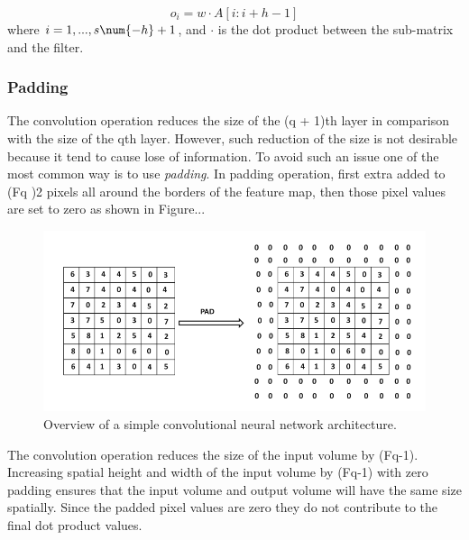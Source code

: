 \begin{equation}
o_i = w \cdot A \left[i:i + h -1\right]
\end{equation}
where $i = 1,. . ., s\num{-h}+1$, and $\cdot$ is the dot product between the sub-matrix and the filter.



\subsubsection{Padding}
The convolution operation reduces the size of the (q + 1)th layer in comparison with the size of the qth layer. However, such reduction of the size is not desirable because it tend to cause lose of information.  To avoid such an issue one of the most common way is to use \textit{padding}. In padding operation, first extra added to (Fq )\/2 pixels all around the borders of the feature map, then those pixel values are set to zero as shown in Figure... 

\begin{figure}[h]
\centering
 \includegraphics[width=\linewidth]{Figures/fig_cnn_padding.png}
 \caption{Overview of a simple convolutional neural network architecture.}
 \label{fig:cnn_padding}
\end{figure}

The convolution operation reduces the size of the input volume by (Fq-1). Increasing spatial height and width of the input volume by (Fq-1) with zero padding ensures that the input volume and output volume will have the same size spatially. Since the padded pixel values are zero they do not contribute to the final dot product values. 
